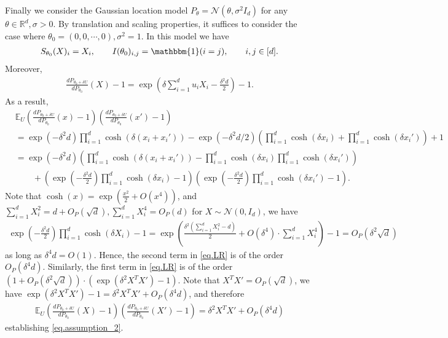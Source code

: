 \documentclass[final,12pt]{colt2018} %
\def \bE {\mathbb{E}}
\def \bR {\mathbb{R}}
\newcommand{\calN}{{\mathcal{N}}}
\begin{document}
Finally we consider the Gaussian location model $P_\theta=\calN(\theta,\sigma^2 I_d)$ for any $\theta\in\bR^d, \sigma>0$. By translation and scaling properties, it suffices to consider the case where $\theta_0=(0,0,\cdots,0), \sigma^2=1$. In this model we have 
\begin{align*}
S_{\theta_0}(X)_i = X_i, \qquad I(\theta_0)_{i,j} = \mathbbm{1}(i=j), \qquad i,j\in [d].
\end{align*}
Moreover, 
\begin{align*}
\frac{dP_{\theta_0+\delta U}}{dP_{\theta_0}}(X) - 1 = \exp\left(\delta\sum_{i=1}^d u_iX_i - \frac{\delta^2d}{2} \right) - 1. 
\end{align*}
As a result, 
\begin{align}
&\bE_U \left( \frac{dP_{\theta_0+\delta U}}{dP_{\theta_0}}(x) - 1 \right)\left( \frac{dP_{\theta_0+\delta U}}{dP_{\theta_0}}(x') - 1 \right) \nonumber\\
&= \exp(-\delta^2d) \prod_{i=1}^d \cosh(\delta(x_i+x_i')) - \exp(-\delta^2d/2) \left(\prod_{i=1}^d \cosh(\delta x_i) + \prod_{i=1}^d \cosh(\delta x_i')\right) + 1 \nonumber\\
&= \exp(-\delta^2d) \left(\prod_{i=1}^d \cosh(\delta(x_i+x_i'))-\prod_{i=1}^d \cosh(\delta x_i)\prod_{i=1}^d \cosh(\delta x_i') \right) \nonumber\\
&\qquad + \left(\exp\left(-\frac{\delta^2d}{2}\right)\prod_{i=1}^d \cosh(\delta x_i)-1 \right) \left(\exp\left(-\frac{\delta^2d}{2}\right)\prod_{i=1}^d \cosh(\delta x_i')-1 \right). \label{eq.LR}
\end{align}
Note that $\cosh(x) = \exp(\frac{x^2}{2}+O(x^4))$, and $\sum_{i=1}^d X_i^2=d+O_P(\sqrt{d}), \sum_{i=1}^d X_i^4 = O_P(d)$ for $X\sim\calN(0,I_d)$, we have
\begin{align*}
\exp\left(-\frac{\delta^2d}{2}\right)\prod_{i=1}^d \cosh(\delta X_i)-1 = \exp\left(\frac{\delta^2(\sum_{i=1}^d X_i^2 - d)}{2} + O(\delta^4)\cdot \sum_{i=1}^d X_i^4 \right) - 1 = O_P(\delta^2\sqrt{d})
\end{align*}
as long as $\delta^4d=O(1)$. Hence, the second term in \eqref{eq.LR} is of the order $O_P(\delta^4d)$. Similarly, the first term in \eqref{eq.LR} is of the order $(1+O_P(\delta^2\sqrt{d}))\cdot (\exp(\delta^2 X^TX')-1)$. Note that $X^TX'=O_P(\sqrt{d})$, we have $\exp(\delta^2 X^TX')-1 = \delta^2 X^TX' + O_P(\delta^4d)$, and therefore
\begin{align*}
\bE_U \left( \frac{dP_{\theta_0+\delta U}}{dP_{\theta_0}}(X) - 1 \right)\left( \frac{dP_{\theta_0+\delta U}}{dP_{\theta_0}}(X') - 1 \right) = \delta^2 X^TX' + O_P(\delta^4d)
\end{align*}
establishing \eqref{eq.assumption_2}. 
\end{document}
